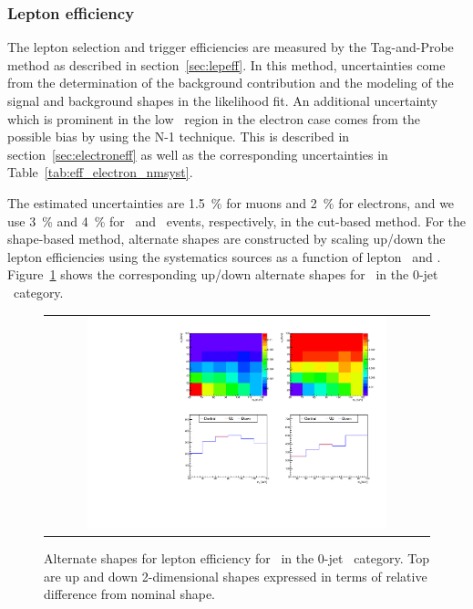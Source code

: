\subsubsection{Lepton efficiency} 

The lepton selection and trigger efficiencies are measured by the Tag-and-Probe method
as described in section~\ref{sec:lepeff}. In this method, uncertainties come from 
the determination of the background contribution and the modeling of the signal 
and background shapes in the likelihood fit. An additional uncertainty which is 
prominent in the low \pt\ region in the electron case 
comes from the possible bias by using the N-1 technique. 
This is described in section~\ref{sec:electroneff} as well as the corresponding 
uncertainties in Table~\ref{tab:eff_electron_nmsyst}.

The estimated uncertainties are 1.5~\% for muons and 2~\% for electrons, 
and we use 3~\% and 4~\% for \mumu\ and \ee\ events, respectively, 
in the cut-based method. 
For the shape-based method, alternate shapes are constructed by
scaling up/down the lepton efficiencies using the systematics sources
as a function of lepton \pt\ and \Eta.
Figure~\ref{fig:alter_lepeff} shows the corresponding up/down alternate shapes
for \qqww\ in the 0-jet \DF\ category. 

%
\begin{figure}[htp]
\centering
\begin{tabular}{c}
\includegraphics[width=0.8\textwidth]{figures/histo_qqWW_CMS_hww_MVALepEffBounding_0j_zoom.pdf}
\end{tabular}
\caption{Alternate shapes for lepton efficiency for \qqww\ in the 0-jet \DF\ category. 
         Top are up and down 2-dimensional shapes expressed in terms of relative 
         difference from nominal shape.}
\label{fig:alter_lepeff}
\end{figure}


